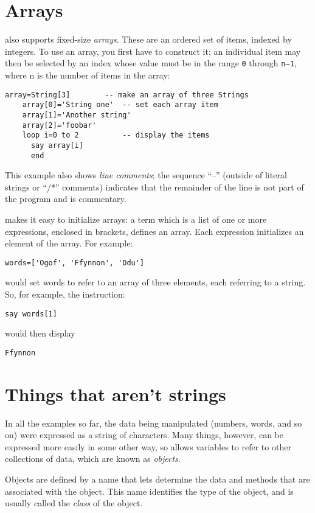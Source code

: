 \section{Arrays}
\nr{} also supports fixed-size \emph{arrays}. These are an ordered set of
items, indexed by integers. To use an array, you first have to
construct it; an individual item may then be selected by an index
whose value must be in the range \texttt{0} through \texttt{n–1}, where n is the number
of items in the array:
\begin{lstlisting}[label=arrays,caption=Arrays]
    array=String[3]        -- make an array of three Strings
    array[0]='String one'  -- set each array item
    array[1]='Another string'
    array[2]='foobar'
    loop i=0 to 2          -- display the items
      say array[i]
      end
\end{lstlisting}
This example also shows \nr{} \emph{line comments}; the sequence “--” (outside of literal strings or “/*” comments) indicates that the remainder of the line is not part of the program and is commentary.

\nr{} makes it easy to initialize arrays: a term which is a list of
one or more expressions, enclosed in brackets, defines an array. Each
expression initializes an element of the array. For example:
\begin{lstlisting}[label=initializingelements,caption=Initializing elements]
words=['Ogof', 'Ffynnon', 'Ddu']
\end{lstlisting}
would set words to refer to an array of three elements, each referring to a string. So, for
example, the instruction:
\begin{lstlisting}[label=addresselement,caption=Address Array Element]
say words[1]
\end{lstlisting}
would then display 
\begin{lstlisting}
Ffynnon
\end{lstlisting}

\section{Things that aren’t strings}
In all the examples so far, the data being manipulated (numbers, words, and so on) were expressed as a string of characters. Many things, however, can be expressed more easily in some other way, so \nr{} allows variables to refer to other collections of data, which are known as \emph{objects}.

Objects are defined by a name that lets \nr{} determine the data and methods that are associated with the object. This name identifies the type of the object, and is usually called the \emph{class} of the object.

